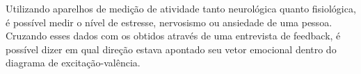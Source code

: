 Utilizando aparelhos de medição de atividade tanto neurológica quanto fisiológica, é possível medir o nível de estresse, nervosismo ou ansiedade de uma pessoa. Cruzando esses dados com os obtidos através de uma entrevista de feedback, é possível dizer em qual direção estava apontado seu vetor emocional dentro do diagrama de excitação-valência.


